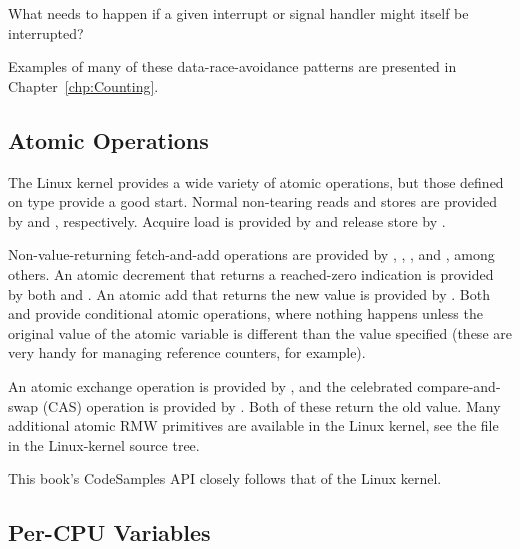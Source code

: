 \QuickQuiz{}
	What needs to happen if a given interrupt or signal handler
	might itself be interrupted?
 \QuickQuizEnd

Examples of many of these data-race-avoidance patterns are presented in
Chapter~\ref{chp:Counting}.

\subsection{Atomic Operations}
\label{sec:toolsoftrade:Atomic Operations}

The Linux kernel provides a wide variety of atomic operations, but
those defined on type  provide a good start.
Normal non-tearing reads and stores are provided by
 and , respectively.
Acquire load is provided by  and release
store by .

Non-value-returning fetch-and-add operations are provided by
, , , and
, among others.
An atomic decrement that returns a reached-zero indication is provided
by both  and .
An atomic add that returns the new value is provided by
.
Both  and  provide
conditional atomic operations, where nothing happens unless the
original value of the atomic variable is different than the value
specified (these are very handy for managing reference counters, for
example).

An atomic exchange operation is provided by , and
the celebrated compare-and-swap (CAS) operation is provided by
.
Both of these return the old value.
Many additional atomic RMW primitives are available in the Linux kernel,
see the  file in the Linux-kernel
source tree.

This book's CodeSamples API closely follows that of the Linux kernel.

\subsection{Per-CPU Variables}
\label{sec:toolsoftrade:Per-CPU Variables}

